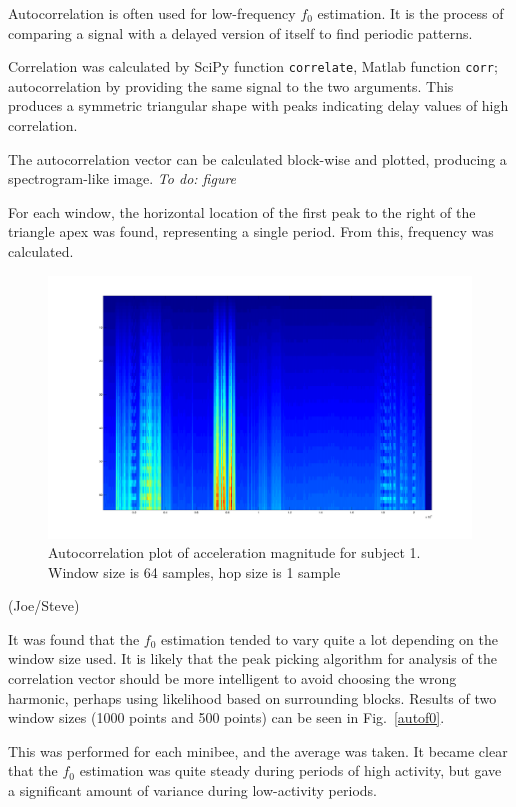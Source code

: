 \documentclass{article}
\newcommand{\todo}[1]{\emph{To do: #1}}
\newcommand{\func}[1]{\texttt{#1}}
\begin{document}
Autocorrelation is often used for low-frequency $f_0$ estimation.
It is the process of comparing a signal with a delayed version of
itself to find periodic patterns.

Correlation was calculated by SciPy function \func{correlate}, Matlab
function \func{corr}; autocorrelation by providing the same signal to
the two arguments.
This produces a symmetric triangular shape with peaks indicating delay
values of high correlation.

The autocorrelation vector can be calculated block-wise and plotted,
producing a spectrogram-like image. \todo{figure}

For each window, the horizontal location of the first peak to the
right of the triangle apex was found, representing a single period.
From this, frequency was calculated.

\begin{figure}
\centerline{\includegraphics[width=\textwidth]{images/node1_autocorrelation_w64.pdf}}
\caption{Autocorrelation plot of acceleration magnitude for subject 1. Window size is 64 samples, hop size is 1 sample}
\label{fig:node1_autocorr}
\end{figure}

(Joe/Steve)

It was found that the $f_0$ estimation tended to vary quite a lot
depending on the window size used.
It is likely that the peak picking algorithm for analysis of the
correlation vector should be more intelligent to avoid choosing the
wrong harmonic, perhaps using likelihood based on surrounding blocks.
Results of two window sizes (1000 points and 500 points) can be seen
in Fig.~\ref{autof0}.

This was performed for each minibee, and the average was taken.  It
became clear that the $f_0$ estimation was quite steady during periods
of high activity, but gave a significant amount of variance during
low-activity periods.
\end{document}
